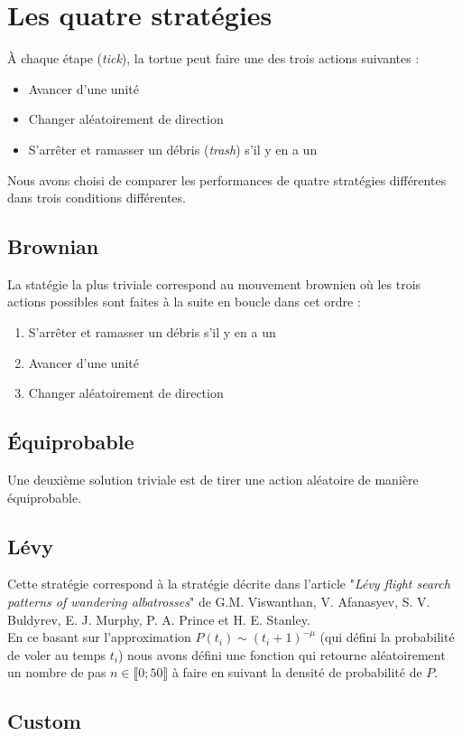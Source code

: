 \section{Les quatre stratégies}
\`{A} chaque étape (\emph{tick}), la tortue peut faire une des trois actions suivantes :
\begin{itemize}
\item Avancer d'une unité
\item Changer aléatoirement de direction
\item S'arrêter et ramasser un débris (\emph{trash}) s'il y en a un
\end{itemize}
Nous avons choisi de comparer les performances de 
quatre stratégies différentes dans trois conditions différentes.

\subsection{Brownian}
La statégie la plus triviale correspond au mouvement brownien où les
trois actions possibles sont faites à la suite en boucle dans cet ordre :
\begin{enumerate}
\item S'arrêter et ramasser un débris s'il y en a un
\item Avancer d'une unité
\item Changer aléatoirement de direction
\end{enumerate}

\subsection{\'{E}quiprobable}
Une deuxième solution triviale est de tirer une action aléatoire de manière
équiprobable.
\subsection{Lévy}
Cette stratégie correspond à la stratégie décrite dans l'article 
"\emph{Lévy flight search patterns of wandering albatrosses}" de 
G.M. Viswanthan, V. Afanasyev, S. V. Buldyrev, E. J. Murphy, 
P. A. Prince et H. E. Stanley. \\
En ce basant sur l'approximation $P(t_i) \sim (t_i + 1)^{-\mu}$
(qui défini la probabilité de voler au temps $t_i$) nous
avons défini une fonction qui retourne aléatoirement
un nombre de pas $n \in \llbracket 0; 50 \rrbracket$ à faire en suivant la densité de probabilité de $P$.

\subsection{Custom}